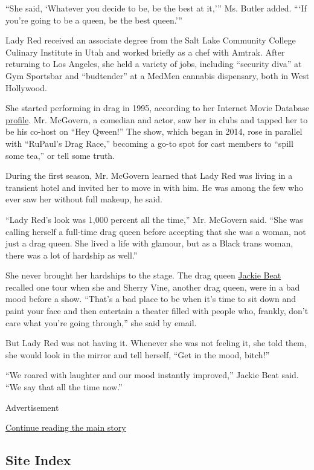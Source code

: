 ``She said, `Whatever you decide to be, be the best at it,''' Ms. Butler
added. ```If you're going to be a queen, be the best queen.'''

Lady Red received an associate degree from the Salt Lake Community
College Culinary Institute in Utah and worked briefly as a chef with
Amtrak. After returning to Los Angeles, she held a variety of jobs,
including ``security diva'' at Gym Sportsbar and ``budtender'' at a
MedMen cannabis dispensary, both in West Hollywood.

She started performing in drag in 1995, according to her Internet Movie
Database
\href{https://www.imdb.com/name/nm4366207/bio?ref_=nm_ov_bio_sm}{profile}.
Mr. McGovern, a comedian and actor, saw her in clubs and tapped her to
be his co-host on ``Hey Qween!'' The show, which began in 2014, rose in
parallel with ``RuPaul's Drag Race,'' becoming a go-to spot for cast
members to ``spill some tea,'' or tell some truth.

During the first season, Mr. McGovern learned that Lady Red was living
in a transient hotel and invited her to move in with him. He was among
the few who ever saw her without full makeup, he said.

``Lady Red's look was 1,000 percent all the time,'' Mr. McGovern said.
``She was calling herself a full-time drag queen before accepting that
she was a woman, not just a drag queen. She lived a life with glamour,
but as a Black trans woman, there was a lot of hardship as well.''

She never brought her hardships to the stage. The drag queen
\href{http://www.missjackiebeat.com/}{Jackie Beat} recalled one tour
when she and Sherry Vine, another drag queen, were in a bad mood before
a show. ``That's a bad place to be when it's time to sit down and paint
your face and then entertain a theater filled with people who, frankly,
don't care what you're going through,'' she said by email.

But Lady Red was not having it. Whenever she was not feeling it, she
told them, she would look in the mirror and tell herself, ``Get in the
mood, bitch!''

``We roared with laughter and our mood instantly improved,'' Jackie Beat
said. ``We say that all the time now.''

Advertisement

\protect\hyperlink{after-bottom}{Continue reading the main story}

\hypertarget{site-index}{%
\subsection{Site Index}\label{site-index}}

